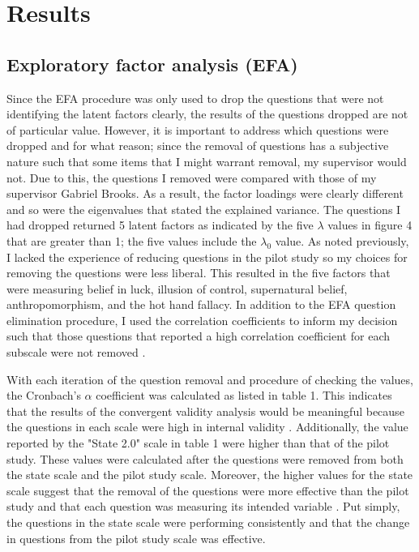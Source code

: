\documentclass[twoside,twocolumn]{article}
\begin{document}

\section{Results}

\subsection{Exploratory factor analysis (EFA)}
Since the EFA procedure was only used to drop the questions that were not identifying the latent factors clearly, the results of the questions dropped are not of particular value. However, it is important to address which questions were dropped and for what reason; since the removal of questions has a subjective nature such that some items that I might warrant removal, my supervisor would not. Due to this, the questions I removed were compared with those of my supervisor Gabriel Brooks. As a result, the factor loadings were clearly different and so were the eigenvalues that stated the explained variance. The questions I had dropped returned 5 latent factors as indicated by the five $\lambda$ values in figure 4 that are greater than 1; the five values include the $\lambda_0$ value. As noted previously, I lacked the experience of reducing questions in the pilot study so my choices for removing the questions were less liberal. This resulted in the five factors that were measuring belief in luck, illusion of control, supernatural belief, anthropomorphism, and the hot hand fallacy. In addition to the EFA question elimination procedure, I used the correlation coefficients to inform my decision such that those questions that reported a high correlation coefficient for each subscale were not removed \cite{efa}.

With each iteration of the question removal and procedure of checking the values, the Cronbach's $\alpha$ coefficient was calculated as listed in table 1. This indicates that the results of the convergent validity analysis would  be meaningful because the questions in each scale were high in internal validity \cite{cronbach}. Additionally, the value reported by the "State 2.0" scale in table 1 were higher than that of the pilot study. These values were calculated after the questions were removed from both the state scale and the pilot study scale. Moreover, the higher values for the state scale suggest that the removal of the questions were more effective than the pilot study and that each question was measuring its intended variable \cite{cronbach}. Put simply, the questions in the state scale were performing consistently and that the change in questions from the pilot study scale was effective.
\end{document}
